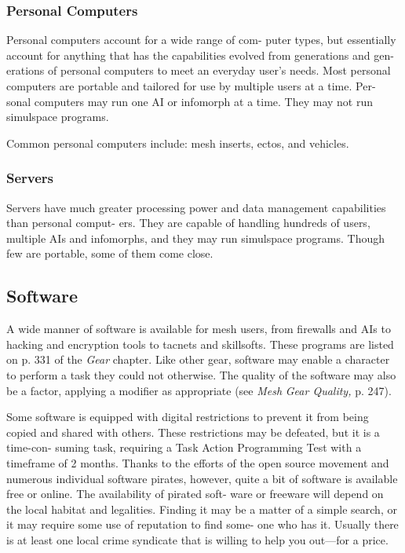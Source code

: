 \subsubsection{Personal Computers}

Personal computers account for a wide range of com-
puter types, but essentially account for anything that 
has the capabilities evolved from generations and gen-
erations of personal computers to meet an everyday 
user's needs. Most personal computers are portable 
and tailored for use by multiple users at a time. Per-
sonal computers may run one AI or infomorph at a 
time. They may not run simulspace programs.

Common personal computers include: mesh inserts, 
ectos, and vehicles.

\subsubsection{Servers}

Servers have much greater processing power and 
data management capabilities than personal comput-
ers. They are capable of handling hundreds of users, 
multiple AIs and infomorphs, and they may run 
simulspace programs. Though few are portable, some 
of them come close.

\subsection{Software}

A wide manner of software is available for mesh users, 
from firewalls and AIs to hacking and encryption tools 
to tacnets and skillsofts. These programs are listed on 
p. 331 of the \textit{Gear }chapter. Like other gear, software 
may enable a character to perform a task they could 
not otherwise. The quality of the software may also be 
a factor, applying a modifier as appropriate (see \textit{Mesh }
\textit{Gear Quality,} p. 247).

Some software is equipped with digital restrictions 
to prevent it from being copied and shared with others. 
These restrictions may be defeated, but it is a time-con-
suming task, requiring a Task Action Programming Test 
with a timeframe of 2 months. Thanks to the efforts 
of the open source movement and numerous individual 
software pirates, however, quite a bit of software is 
available free or online. The availability of pirated soft-
ware or freeware will depend on the local habitat and 
legalities. Finding it may be a matter of a simple search, 
or it may require some use of reputation to find some-
one who has it. Usually there is at least one local crime 
syndicate that is willing to help you out—for a price.

